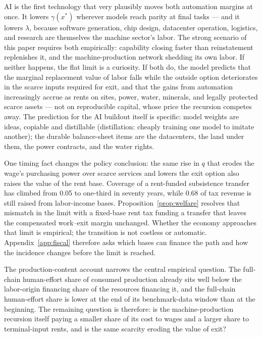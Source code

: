 \documentclass[12pt]{article}
\theoremstyle{plain}
\begin{document}
AI is the first technology that very plausibly moves both automation margins at once. It lowers $\gamma (x^*)$ wherever models reach parity at final tasks --- and it lowers $\lambda$, because software generation, chip design, datacenter operation, logistics, and research are themselves the machine sector's labor. The strong scenario of this paper requires both empirically: capability closing faster than reinstatement replenishes it, and the machine-production network shedding its own labor. If neither happens, the flat limit is a curiosity. If both do, the model predicts that the marginal replacement value of labor falls while the outside option deteriorates in the scarce inputs required for exit, and that the gains from automation increasingly accrue as rents on sites, power, water, minerals, and legally protected scarce assets --- not on reproducible capital, whose price the recursion competes away. The prediction for the AI buildout itself is specific: model weights are ideas, copiable and distillable (distillation: cheaply training one model to imitate another); the durable balance-sheet items are the datacenters, the land under them, the power contracts, and the water rights.

One timing fact changes the policy conclusion: the same rise in $q$ that erodes the wage's purchasing power over scarce services and lowers the exit option also raises the value of the rent base. Coverage of a rent-funded subsistence transfer has climbed from 0.05 to one-third in seventy years, while 0.68 of tax revenue is still raised from labor-income bases. Proposition~\ref{prop:welfare} resolves that mismatch in the limit with a fixed-base rent tax funding a transfer that leaves the compensated work--exit margin unchanged. Whether the economy approaches that limit is empirical; the transition is not costless or automatic. Appendix~\ref{app:fiscal} therefore asks which bases can finance the path and how the incidence changes before the limit is reached.

The production-content account narrows the central empirical question. The full-chain human-effort share of consumed production already sits well below the labor-origin financing share of the resources financing it, and the full-chain human-effort share is lower at the end of its benchmark-data window than at the beginning. The remaining question is therefore: is the machine-production recursion itself paying a smaller share of its cost to wages and a larger share to terminal-input rents, and is the same scarcity eroding the value of exit?
\end{document}
